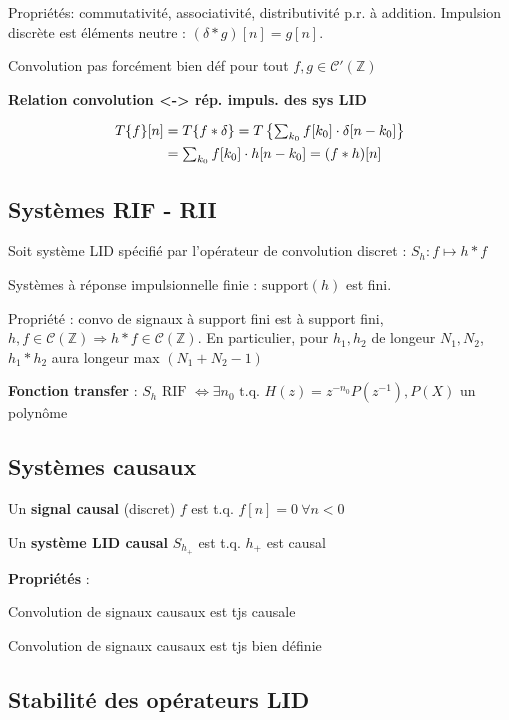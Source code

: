 Propriétés: commutativité, associativité, distributivité p.r. à addition. Impulsion discrète est éléments neutre : $(\delta * g)[n] = g[n]$.

Convolution pas forcément bien déf pour tout $f,g\in\mathcal{C'}(\mathbb{Z})$

\textbf{Relation convolution <-> rép. impuls. des sys LID}

\begin{align*}
    T\{f\}[n] & = T\{f*\delta\} = T\left\{\textstyle\sum_{k_0}f[k_0]\cdot\delta[n-k_0]\right\}\\
    & = \textstyle\sum_{k_0}f[k_0]\cdot h[n-k_0] = (f*h)[n]
\end{align*}

\subsection*{Systèmes RIF - RII}

Soit système LID spécifié par l'opérateur de convolution discret : $S_h : f \mapsto h*f$

Systèmes à réponse impulsionnelle finie : $\text{support}(h)$ est fini. 

Propriété : convo de signaux à support fini est à support fini, $h,f\in\mathcal{C}(\mathbb{Z}) \Rightarrow h*f \in\mathcal{C}(\mathbb{Z})$. En particulier, pour $h_1,h_2$ de longeur $N_1,N_2$, $h_1*h_2$ aura longeur max $(N_1+N_2-1)$

\textbf{Fonction transfer} : $S_h \text{ RIF } \iff \exists n_0 \text{ t.q. } H(z) = z^{-n_0}P(z^{-1}), P(X)$ un polynôme

\subsection*{Systèmes causaux}

Un \textbf{signal causal} (discret) $f$ est t.q. $f[n]=0 \: \forall n<0$

Un \textbf{système LID causal} $S_{h_+}$ est t.q. $h_+$ est causal

\textbf{Propriétés} :
\begin{myitemize}
    \item Convolution de signaux causaux est tjs causale
    \item Convolution de signaux causaux est tjs bien définie
\end{myitemize}

\subsection*{Stabilité des opérateurs LID}

